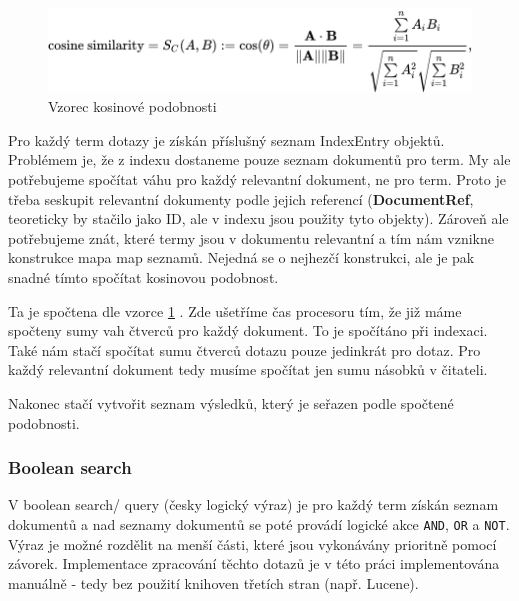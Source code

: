 \documentclass[12pt, letterpaper]{article}
\begin{document}
\begin{figure}[H]
    \centering
    \includegraphics[width=\linewidth]{img/cos_formula}
    \caption{Vzorec kosinové podobnosti}
    \label{fig:cos_similarity}
\end{figure}

Pro každý term dotazy je získán příslušný seznam IndexEntry objektů. Problémem je, že z indexu dostaneme pouze seznam
dokumentů pro term. My ale potřebujeme spočítat váhu pro každý relevantní dokument, ne pro term. Proto je třeba
seskupit relevantní dokumenty podle jejich referencí (\textbf{DocumentRef}, teoreticky by stačilo jako ID, ale v
indexu jsou použity tyto objekty). Zároveň ale potřebujeme znát, které termy jsou v dokumentu relevantní a tím nám
vznikne konstrukce mapa map seznamů. Nejedná se o nejhezčí
konstrukci, ale je pak snadné tímto spočítat kosinovou podobnost.

Ta je spočtena dle vzorce \ref{fig:cos_similarity} . Zde ušetříme čas procesoru tím, že již máme spočteny sumy vah
čtverců pro každý dokument. To je spočítáno při indexaci. Také nám stačí spočítat sumu čtverců dotazu pouze jedinkrát
pro dotaz. Pro každý relevantní dokument tedy musíme spočítat jen sumu násobků v čitateli.

Nakonec stačí vytvořit seznam výsledků, který je seřazen podle spočtené podobnosti.
%
\subsubsection{Boolean search}
V boolean search/ query (česky logický výraz) je pro každý term získán seznam dokumentů a nad seznamy dokumentů se
poté provádí logické akce \texttt{AND}, \texttt{OR} a \texttt{NOT}. Výraz je možné rozdělit na menší části, které
jsou vykonávány prioritně pomocí závorek. Implementace zpracování těchto dotazů je v této práci implementována
manuálně - tedy bez použití knihoven třetích stran (např. Lucene).
\end{document}

